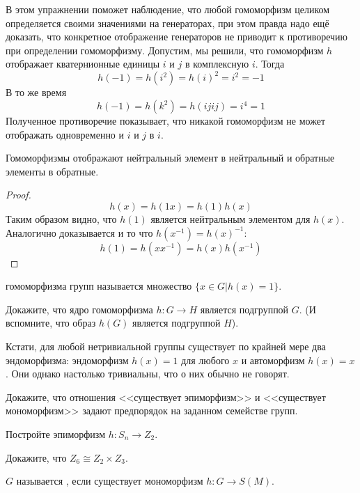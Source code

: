 В этом упражнении поможет наблюдение, что любой гомоморфизм целиком определяется своими значениями на генераторах, при этом правда надо ещё доказать, что конкретное отображение генераторов не приводит к противоречию при определении гомоморфизму. Допустим, мы решили, что гомоморфизм $h$ отображает кватернионные единицы $i$ и $j$ в комплексную $i$. Тогда
\[
h(-1) = h(i^2) = h(i)^2 = i^2 = -1
\]
В то же время
\[
h(-1) = h(k^2) = h(ijij) = i^4 = 1
\]
Полученное противоречие показывает, что никакой гомоморфизм не может отображать одновременно и $i$ и $j$ в $i$.

\begin{thm}
	Гомоморфизмы отображают нейтральный элемент в нейтральный и обратные элементы в обратные.
\end{thm}
\begin{proof}
	\[
	h(x) = h(1x) = h(1)h(x)
	\]
	Таким образом видно, что $h(1)$ является нейтральным элементом для $h(x)$. Аналогично доказывается и то что $h(x^{-1})=h(x)^{-1}$:
	\[
	h(1) = h(xx^{-1}) = h(x)h(x^{-1})
	\]
\end{proof}

\begin{definition}
	 гомоморфизма групп называется множество $\{x\in G|h(x) = 1\}$.
\end{definition}

\begin{exercise}
	Докажите, что ядро гомоморфизма ${h:G\to H}$ является подгруппой $G$. (И вспомните, что образ $h(G)$ является подгруппой $H$).
\end{exercise}

Кстати, для любой нетривиальной группы существует по крайней мере два эндоморфизма: эндоморфизм $h(x)=1$ для любого $x$ и автоморфизм $h(x)=x$. Они однако настолько тривиальны, что о них обычно не говорят.

\begin{exercise}
	Докажите, что отношения <<существует эпиморфизм>> и <<существует мономорфизм>> задают предпорядок на заданном семействе групп.
\end{exercise}

\begin{exercise}
	Постройте эпиморфизм $h:S_n\to Z_2$.
\end{exercise}

\begin{exercise}
	Докажите, что $Z_6\cong Z_2\times Z_3$.
\end{exercise}

\begin{definition}
	$G$ называется , если существует мономорфизм $h:G\to S(M)$.
\end{definition}

